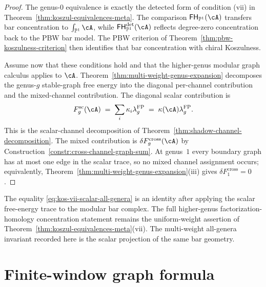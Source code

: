 \begin{proof}
The genus-$0$ equivalence is exactly the detected form of condition
\textup{(vii)} in
Theorem~\textup{\ref{thm:koszul-equivalences-meta}}. The comparison
$\mathsf{FH}_{\mathbb{P}^1}(\cA)$ transfers bar concentration to
$\int_{\mathbb{P}^1}\cA$, while
$\mathsf{FH}^{\mathrm{det}}_{\mathbb{P}^1}(\cA)$ reflects
degree-zero concentration back to the PBW bar model. The PBW criterion
of Theorem~\textup{\ref{thm:pbw-koszulness-criterion}} then identifies
that bar concentration with chiral Koszulness.

Assume now that these conditions hold and that the higher-genus
modular graph calculus applies to $\cA$. Theorem~\textup{\ref{thm:multi-weight-genus-expansion}}
decomposes the genus-$g$ stable-graph free energy into the diagonal
per-channel contribution and the mixed-channel contribution. The
diagonal scalar contribution is
\[
F_g^{\mathrm{sc}}(\cA)
\;=\;
\sum_i\kappa_i\lambda_g^{\mathrm{FP}}
\;=\;
\kappa(\cA)\lambda_g^{\mathrm{FP}}.
\]
This is the scalar-channel decomposition of
Theorem~\textup{\ref{thm:shadow-channel-decomposition}}. The mixed
contribution is
$\delta F_g^{\mathrm{cross}}(\cA)$ by
Construction~\textup{\ref{constr:cross-channel-graph-sum}}. At
genus~$1$ every boundary graph has at most one edge in the scalar
trace, so no mixed channel assignment occurs; equivalently,
Theorem~\textup{\ref{thm:multi-weight-genus-expansion}}\textup{(iii)}
gives $\delta F_1^{\mathrm{cross}}=0$.
\end{proof}

\begin{remark}
\label{rem:kos-vii-scalar-not-full-concentration}
The equality \textup{\ref{eq:kos-vii-scalar-all-genera}} is an
identity after applying the scalar free-energy trace to the modular
bar complex. The full higher-genus factorization-homology
concentration statement remains the uniform-weight assertion of
Theorem~\textup{\ref{thm:koszul-equivalences-meta}}\textup{(vii)}.
The multi-weight all-genera invariant recorded here is the scalar
projection of the same bar geometry.
\end{remark}

\section{Finite-window graph formula}
\label{sec:kos-vii-universal}

